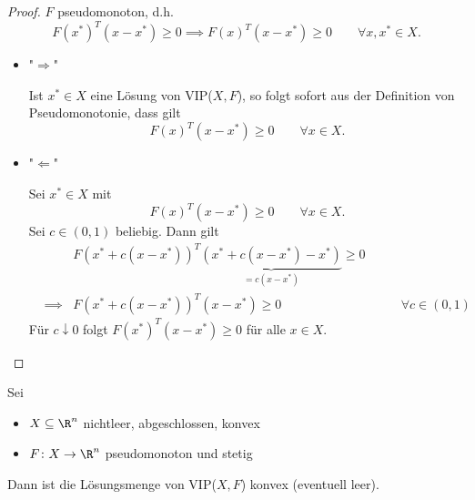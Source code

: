 \begin{proof}
	$F$ pseudomonoton, d.h.
	\[
		F({x}^{*})^{T}(x-{x}^{*}) \geq  0 \implies F(x)^{T}(x-{x}^{*}) \geq  0 \qquad \forall x, {x}^{*} \in X
	.\] 
	\begin{itemize}
		\item "$\Longrightarrow$"
	
			Ist ${x}^{*} \in X$ eine Lösung von VIP($X,F$), so folgt sofort aus der Definition von Pseudomonotonie, dass gilt
			\[
				F(x)^{T}(x-{x}^{*}) \geq  0 \qquad \forall x \in X
			.\] 
	
		\item "$\Longleftarrow$"
	
		Sei ${x}^{*} \in X$ mit
		\[
			F(x)^{T}(x-{x}^{*}) \geq  0 \qquad \forall x \in X
		.\]
		Sei $c \in (0,1)$ beliebig. Dann gilt
		\begin{align*}
		&&F({x}^{*} + c (x-{x}^{*}))^{T}\underbrace{({x}^{*} + c(x-{x}^{*}) - {x}^{*})}_{=c(x-{x}^{*})} \geq 0 & \\
		&\implies&
			F({x}^{*} + c(x-{x}^{*}))^{T}(x-{x}^{*}) \geq 0&\qquad\forall c \in (0,1)
		\end{align*}
		Für $c \downarrow 0$ folgt $F({x}^{*})^{T}(x-{x}^{*}) \geq  0$ für alle $x \in X$.
	
	\end{itemize}
\end{proof}

\begin{satz}
	Sei
	\begin{itemize}
		\item $X \subseteq \R^{n}$ nichtleer, abgeschlossen, konvex
		\item $F \colon X \rightarrow \R^{n} $ pseudomonoton und stetig
	\end{itemize}
	Dann ist die Lösungsmenge von VIP($X,F$) konvex (eventuell leer).
\end{satz}

